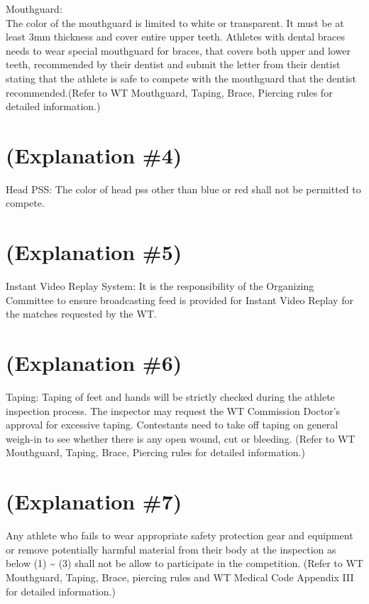 \documentclass[
]{report}
\begin{document}
Mouthguard:\\
The color of the mouthguard is limited to white or transparent. It must
be at least 3mm thickness and cover entire upper teeth. Athletes with
dental braces needs to wear special mouthguard for braces, that covers
both upper and lower teeth, recommended by their dentist and submit the
letter from their dentist stating that the athlete is safe to compete
with the mouthguard that the dentist recommended.(Refer to WT
Mouthguard, Taping, Brace, Piercing rules for detailed information.)

\section{(Explanation \#4)}\label{explanation-4}

Head PSS: The color of head pss other than blue or red shall not be
permitted to compete.

\section{(Explanation \#5)}\label{explanation-5}

Instant Video Replay System: It is the responsibility of the Organizing
Committee to ensure broadcasting feed is provided for Instant Video
Replay for the matches requested by the WT.

\section{(Explanation \#6)}\label{explanation-6}

Taping: Taping of feet and hands will be strictly checked during the
athlete inspection process. The inspector may request the WT Commission
Doctor's approval for excessive taping. Contestants need to take off
taping on general weigh-in to see whether there is any open wound, cut
or bleeding. (Refer to WT Mouthguard, Taping, Brace, Piercing rules for
detailed information.)

\section{(Explanation \#7)}\label{explanation-7}

Any athlete who fails to wear appropriate safety protection gear and
equipment or remove potentially harmful material from their body at the
inspection as below (1) \textasciitilde{} (3) shall not be allow to
participate in the competition. (Refer to WT Mouthguard, Taping, Brace,
piercing rules and WT Medical Code Appendix III for detailed
information.)
\end{document}
